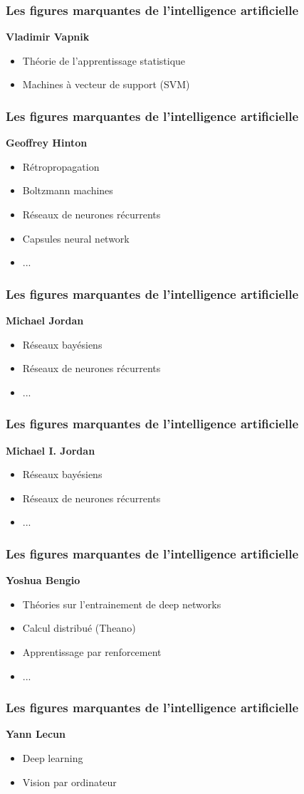 \begin{frame}
  \frametitle{Les figures marquantes de l'intelligence artificielle}
  \textbf{Vladimir Vapnik}
  \begin{itemize}
  \item Théorie de l'apprentissage statistique
  \item Machines à vecteur de support (SVM)
  \end{itemize}
\end{frame}

\begin{frame}
  \frametitle{Les figures marquantes de l'intelligence artificielle}
  \textbf{Geoffrey Hinton}
  \begin{itemize}
  \item Rétropropagation
  \item Boltzmann machines
  \item Réseaux de neurones récurrents
  \item Capsules neural network
  \item ...
  \end{itemize}
\end{frame}

\begin{frame}
  \frametitle{Les figures marquantes de l'intelligence artificielle}
  \textbf{Michael Jordan}
  \begin{itemize}
  \item Réseaux bayésiens
  \item Réseaux de neurones récurrents
  \item ...
  \end{itemize}
\end{frame}

\begin{frame}
  \frametitle{Les figures marquantes de l'intelligence artificielle}
  \textbf{Michael I. Jordan}
  \begin{itemize}
  \item Réseaux bayésiens
  \item Réseaux de neurones récurrents
  \item ...
  \end{itemize}
\end{frame}

\begin{frame}
  \frametitle{Les figures marquantes de l'intelligence artificielle}
  \textbf{Yoshua Bengio}
  \begin{itemize}
  \item Théories sur l'entrainement de deep networks
  \item Calcul distribué (Theano)
  \item Apprentissage par renforcement
  \item ...
  \end{itemize}
\end{frame}

\begin{frame}
  \frametitle{Les figures marquantes de l'intelligence artificielle}
  \textbf{Yann Lecun}
  \begin{itemize}
  \item Deep learning
  \item Vision par ordinateur
  \end{itemize}
\end{frame}

